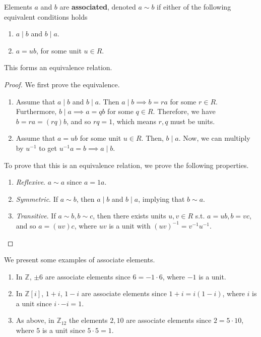  \begin{definition}
    Elements $a$ and $b$ are \textbf{associated}, denoted $a \sim b$ if either of the following equivalent conditions holds
    \begin{enumerate}
      \item $a \mid b$ and $b \mid a$. 
      \item $a = u b$, for some unit $u \in R$. 
    \end{enumerate}
    This forms an equivalence relation. 
  \end{definition} 
  \begin{proof}
    We first prove the equivalence. 
    \begin{enumerate}
      \item Assume that $a \mid b$ and $b \mid a$. Then $a \mid b \implies b = ra$ for some $r \in R$. Furthermore, $b \mid a \implies a = qb$ for some $q \in R$. Therefore, we have $b = ra = (rq)b$, and so $rq = 1$, which means $r, q$ must be units. 
      \item Assume that $a = ub$ for some unit $u \in R$. Then, $b \mid a$. Now, we can multiply by $u^{-1}$ to get $u^{-1} a = b \implies a \mid b$. 
    \end{enumerate}
    To prove that this is an equivalence relation, we prove the following properties. 
    \begin{enumerate}
      \item \textit{Reflexive}. $a \sim a$ since $a = 1a$. 
      \item \textit{Symmetric}. If $a \sim b$, then $a \mid b$ and $b \mid a$, implying that $b \sim a$. 
      \item \textit{Transitive}. If $a \sim b, b \sim c$, then there exists units $u, v \in R$ s.t. $a = ub, b = vc$, and so $a = (uv)c$, where $uv$ is a unit with $(uv)^{-1} = v^{-1} u^{-1}$. 
    \end{enumerate}
  \end{proof}

  \begin{example}
    We present some examples of associate elements. 
    \begin{enumerate}
      \item In $\mathbb{Z}$, $\pm 6$ are associate elements since $6 = -1 \cdot 6$, where $-1$ is a unit. 
      \item In $\mathbb{Z}[i]$, $1 + i$, $1 - i$ are associate elements since $1 + i = i (1 - i)$, where $i$ is a unit since $i \cdot -i = 1$. 
      \item As above, in $\mathbb{Z}_{12}$ the elements $2, 10$ are associate elements since $2 = 5 \cdot 10$, where $5$ is a unit since $5 \cdot 5 = 1$. 
    \end{enumerate}
  \end{example}

